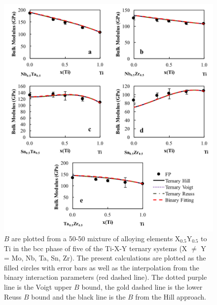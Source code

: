\pagebreak
\begin{figure}[H]
	\centering
	\includegraphics[width=\textwidth]{Chapter-6/Figures/tixybulk2.png}
	\caption{$B$ are plotted from a 50-50 mixture of alloying elements X$_{0.5}$Y$_{0.5}$ to Ti in the bcc phase of five of the Ti-X-Y ternary systems (X $\neq$ Y = Mo, Nb, Ta, Sn, Zr). The present calculations are plotted as the filled circles with error bars as well as the interpolation from the binary interaction parameters (red dashed line). The dotted purple line is the Voigt upper $B$ bound, the gold dashed line is the lower Reuss $B$ bound and the black line is the $B$ from the Hill approach.}
	\label{Ch6-figure:tixybulk2}
\end{figure}

